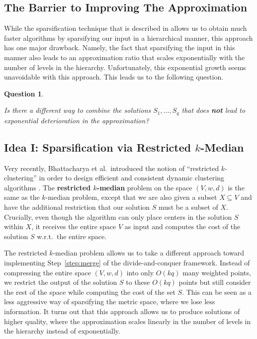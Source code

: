 \documentclass[11pt]{article}
\newenvironment{wrapper}[1]
{
\begin{center}
		\begin{minipage}{\linewidth}
			\begin{mdframed}[hidealllines=true, backgroundcolor=gray!20, leftmargin=0cm,innerleftmargin=0.4cm,innerrightmargin=0.4cm,innertopmargin=0.4cm,innerbottommargin=0.4cm,roundcorner=0pt]
				#1}
			{\end{mdframed}
		\end{minipage}
	\end{center}
}
\newcommand{\1}{\mathmybb{1}}
\newtheorem{question}{Question}
\begin{document}
\subsection{The Barrier to Improving The Approximation}

While the sparsification technique that is described in  allows us to obtain much faster algorithms by sparsifying our input in a hierarchical manner, this approach has one major drawback. Namely, the fact that sparsifying the input in this manner also leads to an approximation ratio that scales exponentially with the number of levels in the hierarchy. Unfortunately, this exponential growth seems unavoidable with this approach. This leads us to the following question.
\begin{wrapper}
\begin{question}\label{Q2}
\begin{center}
Is there a different way to combine the solutions $S_1, \dots,S_q$ that does \textbf{\emph{not}} lead to exponential deterioration in the approximation?
\end{center}
\end{question}
\end{wrapper}


\subsection{Idea I: Sparsification via Restricted $k$-Median}

Very recently, Bhattacharya et al.~introduced the notion of ``restricted $k$-clustering'' in order to design efficient and consistent dynamic clustering algorithms \cite{focs/BCLP24}. The \textbf{restricted $k$-median} problem on the space $(V,w,d)$ is the same as the $k$-median problem, except that we are also given a subset $X \subseteq V$ and have the additional restriction that our solution $S$ must be a subset of $X$. Crucially, even though the algorithm can only place centers in the solution $S$ within $X$, it receives the entire space $V$ as input and computes the cost of the solution $S$ w.r.t.~the entire space. 

The restricted $k$-median problem allows us to take a different approach toward implementing Step~\ref{step:merge} of the divide-and-conquer framework. Instead of compressing the entire space $(V,w,d)$ into only $O(kq)$ many weighted points, we restrict the output of the solution $S$ to these $O(kq)$ points but still consider the rest of the space while computing the cost of the set $S$.
This can be seen as a less aggressive way of sparsifying the metric space, where we lose less information.
It turns out that this approach allows us to produce solutions of higher quality, where the approximation scales linearly in the number of levels in the hierarchy instead of exponentially.
\end{document}
